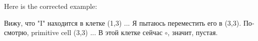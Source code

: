 \documentclass{article}
\begin{document}
Here is the corrected example:

\bigskip


\foreignlanguage{russian}{Вижу, что} "I" \foreignlanguage{russian}{находится в клетке (1,3) ... Я пытаюсь переместить его в (3,3). Посмотрю,} primitive cell (3,3) \foreignlanguage{russian}{... В этой клетке сейчас $\circ$, значит, пустая.}
\end{document}
